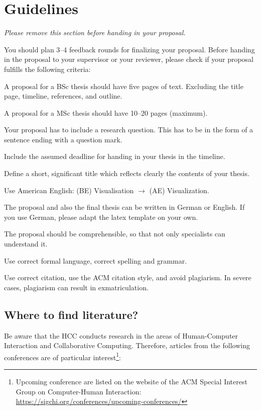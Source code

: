 \pagecolor{fu-orange}

\section*{Guidelines}
\emph{Please remove this section before handing in your proposal.}

You should plan 3--4 feedback rounds for finalizing your proposal.
Before handing in the proposal to your supervisor or your reviewer, please check if your proposal fulfills the following criteria:

\begin{todolist}
  \item A proposal for a BSc thesis should have five pages of text. Excluding the title page, timeline, references, and outline.
  \item A proposal for a MSc thesis should have 10--20 pages (maximum).
  \item Your proposal has to include a research question. This has to be in the form of a sentence ending with a question mark.
  \item Include the assumed deadline for handing in your thesis in the timeline.
  \item Define a short, significant title which reflects clearly the contents of your thesis.
  \item Use American English: (BE) Visualisation $\rightarrow$ (AE) Visualization.
  \item The proposal and also the final thesis can be written in German or English. If you use German, please adapt the latex template on your own.
  \item  The proposal should be comprehensible, so that not only specialists can understand it.
  \item Use correct formal language, correct spelling and grammar.
  \item Use correct citation, use the ACM citation style, and avoid plagiarism. In severe cases, plagiarism can result in exmatriculation.
 
\end{todolist}

\subsection*{Where to find literature?}
Be aware that the HCC conducts research in the areas of Human-Computer Interaction and Collaborative Computing. Therefore, articles from the following conferences are of particular interest\footnote{Upcoming conference are listed on the website of the ACM Special Interest Group on Computer-Human Interaction: \url{https://sigchi.org/conferences/upcoming-conferences/}}: 

